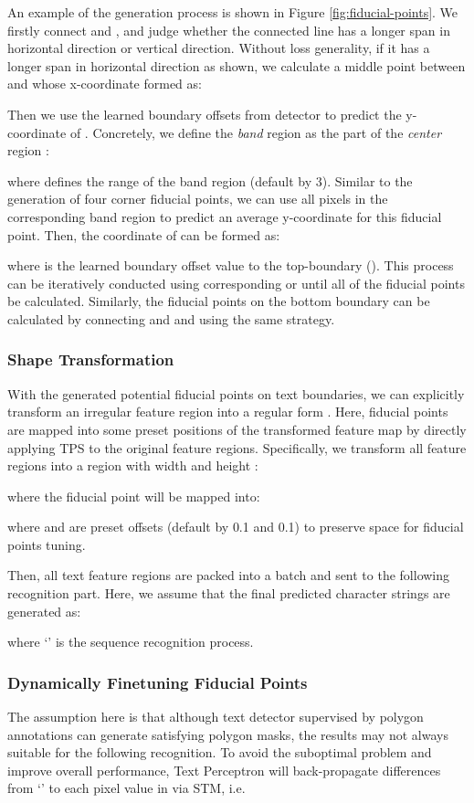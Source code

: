 \documentclass[letterpaper]{article} \usepackage{aaai20}  \usepackage{times}  \usepackage{helvet} \usepackage{courier}  \usepackage[hyphens]{url}  \usepackage{graphicx} \urlstyle{rm} \def\UrlFont{\rm}  \usepackage{graphicx}  \frenchspacing  \setlength{\pdfpagewidth}{8.5in}  \setlength{\pdfpageheight}{11in}  \usepackage{amsmath}
\begin{document}
An example of the generation process is shown in Figure \ref{fig:fiducial-points}.
We firstly connect  and , and judge whether the connected line has a longer span in horizontal direction or vertical direction. Without loss generality, if it has a longer span in horizontal direction as shown, we calculate a middle point   between  and  whose x-coordinate formed as:

Then we use the learned boundary offsets from detector to predict the y-coordinate of . Concretely, we define the \emph{band} region  as the part of the \emph{center} region :

where  defines the range of the band region (default by 3). Similar to the generation of four corner fiducial points, we can use all pixels in the corresponding band region to predict an average y-coordinate for this fiducial point. Then, the coordinate of  can be formed as:

where  is the learned boundary offset value to the top-boundary ().
This process can be iteratively conducted using corresponding  or  until all of the fiducial points be calculated.
Similarly, the fiducial points on the bottom boundary can be calculated by connecting  and  and using the same strategy.

\subsubsection{Shape Transformation}
With the generated potential fiducial points on text boundaries, we can explicitly transform an irregular feature region  into a regular form .
Here, fiducial points are mapped into some preset positions of the transformed feature map by directly applying TPS to the original feature regions.
Specifically, we transform all feature regions into a region with width  and height :

where the fiducial point  will be mapped into:

where  and  are preset offsets (default by 0.1 and 0.1) to preserve space for fiducial points tuning.

Then, all text feature regions are packed into a batch and sent to the following recognition part.
Here, we assume that the final predicted character strings  are generated as:

where `' is the sequence recognition process.

\subsubsection{Dynamically Finetuning Fiducial Points}
The assumption here is that although text detector supervised by polygon annotations can generate satisfying polygon masks, the results may not always suitable for the following recognition.
To avoid the suboptimal problem and improve overall performance, Text Perceptron will back-propagate differences from `' to each pixel value in  via STM, i.e.
\end{document}
